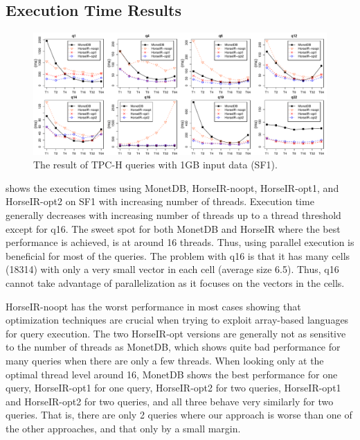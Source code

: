 

\subsection{Execution Time Results}

\begin{figure}[htbp]
\centering
\includegraphics[width=\textwidth]{./src/figure/sf1-v2.pdf}
\caption{The result of TPC-H queries with 1GB input data (SF1).}
\label{fig:tpch_result}
\end{figure}


 shows the execution times using MonetDB, HorseIR-noopt,
HorseIR-opt1, and HorseIR-opt2 on SF1 with increasing number of threads. 
Execution time generally decreases with increasing number of threads up to a
thread threshold except for q16. The sweet spot for both MonetDB and HorseIR
where the best performance is achieved, is at around 16 threads. Thus, using
parallel execution is beneficial for most of the queries. The problem with q16
is that it has many cells (18314) with only a very small vector in each cell
(average size 6.5). Thus, q16 cannot take advantage of parallelization as it
focuses on the vectors in the cells. 

HorseIR-noopt has the worst performance in most cases showing that optimization
techniques are crucial when trying to exploit array-based languages for query
execution. The two HorseIR-opt versions are generally not as sensitive to the
number of threads as MonetDB, which shows quite bad performance for many
queries when there are only a few threads. 
When looking only at the optimal thread level around 16, MonetDB shows the best
performance for one query, HorseIR-opt1 for one query, HorseIR-opt2 for two
queries, HorseIR-opt1 and HorseIR-opt2 for two queries, and all three behave
very similarly for two queries. That is, there are only 2 queries where our
approach is worse than one of the other approaches, and that only by a small
margin.

